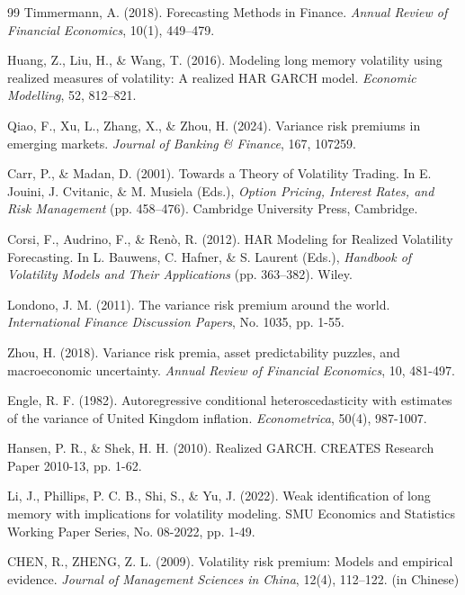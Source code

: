 \documentclass[a4paper, 12pt]{article}    %
\begin{document}
\begin{thebibliography}{99}
Timmermann, A. (2018). Forecasting Methods in Finance. \textit{Annual Review of Financial Economics}, 10(1), 449–479.

Huang, Z., Liu, H., \& Wang, T. (2016). Modeling long memory volatility using realized measures of volatility: A realized HAR GARCH model. \textit{Economic Modelling}, 52, 812–821. 

Qiao, F., Xu, L., Zhang, X., \& Zhou, H. (2024). Variance risk premiums in emerging markets. \textit{Journal of Banking \& Finance}, 167, 107259.

Carr, P., \& Madan, D. (2001). Towards a Theory of Volatility Trading. In E. Jouini, J. Cvitanic, \& M. Musiela (Eds.), \textit{Option Pricing, Interest Rates, and Risk Management} (pp. 458–476). Cambridge University Press, Cambridge.

Corsi, F., Audrino, F., \& Renò, R. (2012). HAR Modeling for Realized Volatility Forecasting. In L. Bauwens, C. Hafner, \& S. Laurent (Eds.), \textit{Handbook of Volatility Models and Their Applications} (pp. 363–382). Wiley.

Londono, J. M. (2011). The variance risk premium around the world. \textit{International Finance Discussion Papers}, No. 1035, pp. 1-55.

Zhou, H. (2018). Variance risk premia, asset predictability puzzles, and macroeconomic uncertainty. \textit{Annual Review of Financial Economics}, 10, 481-497.

Engle, R. F. (1982). Autoregressive conditional heteroscedasticity with estimates of the variance of United Kingdom inflation. \textit{Econometrica}, 50(4), 987-1007.

Hansen, P. R., \& Shek, H. H. (2010). Realized GARCH. CREATES Research Paper 2010-13, pp. 1-62.

Li, J., Phillips, P. C. B., Shi, S., \& Yu, J. (2022). Weak identification of long memory with implications for volatility modeling. SMU Economics and Statistics Working Paper Series, No. 08-2022, pp. 1-49.

CHEN, R., ZHENG, Z. L. (2009). Volatility risk premium: Models and empirical evidence. \textit{Journal of Management Sciences in China}, 12(4), 112–122. (in Chinese)


\end{thebibliography}
\end{document}
